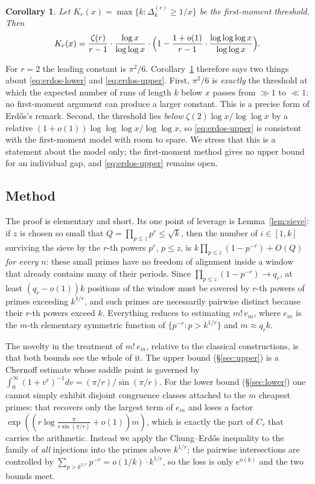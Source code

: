 \documentclass[11pt,reqno]{amsart}
\theoremstyle{plain}
\newtheorem{corollary}[theorem]{Corollary}
\theoremstyle{definition}
\numberwithin{equation}{section}
\begin{document}
\begin{corollary}\label{cor:threshold}
Let $K_r(x)=\max\{k:\Delta^{(r)}_k\ge1/x\}$ be the first-moment threshold. Then
\[
  K_r(x)=\frac{\zeta(r)}{r-1}\cdot\frac{\log x}{\log\log x}\cdot
  \Bigl(1-\frac{1+o(1)}{r-1}\cdot\frac{\log\log\log x}{\log\log x}\Bigr).
\]
\end{corollary}

For $r=2$ the leading constant is $\pi^{2}/6$. Corollary~\ref{cor:threshold} therefore says
two things about \eqref{eq:erdos-lower} and \eqref{eq:erdos-upper}. First, $\pi^{2}/6$ is
\emph{exactly} the threshold at which the expected number of runs of length $k$ below $x$
passes from $\gg1$ to $\ll1$: no first-moment argument can produce a larger constant. This
is a precise form of Erd\H{o}s's remark. Second, the threshold lies \emph{below}
$\zeta(2)\log x/\log\log x$ by a relative $(1+o(1))\log\log\log x/\log\log x$, so
\eqref{eq:erdos-upper} is consistent with the first-moment model with room to spare. We
stress that this is a statement about the model only; the first-moment method gives no
upper bound for an individual gap, and \eqref{eq:erdos-upper} remains open.

\subsection*{Method}
The proof is elementary and short. Its one point of leverage is Lemma~\ref{lem:sieve}: if
$z$ is chosen so small that $Q=\prod_{p\le z}p^{r}\le\sqrt k$, then the number of
$i\in[1,k]$ surviving the sieve by the $r$-th powers $p^{r}$, $p\le z$, is
$k\prod_{p\le z}(1-p^{-r})+O(Q)$ \emph{for every} $n$: these small primes have no freedom
of alignment inside a window that already contains many of their periods. Since
$\prod_{p\le z}(1-p^{-r})\to q_r$, at least $(q_r-o(1))k$ positions of the window must be
covered by $r$-th powers of primes exceeding $k^{1/r}$, and such primes are necessarily
pairwise distinct because their $r$-th powers exceed $k$. Everything reduces to estimating
$m!\,e_m$, where $e_m$ is the $m$-th elementary symmetric function of
$\{p^{-r}:p>k^{1/r}\}$ and $m\approx q_rk$.

The novelty in the treatment of $m!\,e_m$, relative to the classical constructions, is that
both bounds see the whole of it. The upper bound (\S\ref{sec:upper}) is a Chernoff estimate
whose saddle point is governed by $\int_0^{\infty}(1+v^{r})^{-1}dv=(\pi/r)/\sin(\pi/r)$.
For the lower bound (\S\ref{sec:lower}) one cannot simply exhibit disjoint congruence
classes attached to the $m$ cheapest primes: that recovers only the largest term of $e_m$
and loses a factor $\exp((r\log\frac{\pi}{r\sin(\pi/r)}+o(1))m)$, which is exactly the part
of $C_r$ that carries the arithmetic. Instead we apply the Chung--Erd\H{o}s inequality to
the family of \emph{all} injections into the primes above $k^{1/r}$; the pairwise
intersections are controlled by $\sum_{p>k^{1/r}}p^{-r}=o(1/k)\cdot k^{1/r}$, so the loss
is only $e^{o(k)}$ and the two bounds meet.
\end{document}
